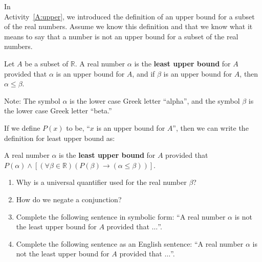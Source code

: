 \begin{activity} \label{A:least}
In \\ Activity~\ref{A:upper}, we introduced the definition of an upper bound for a subset of the real numbers.  Assume we know this definition and that we know what it means to say that a number is not an upper bound for a subset of the real numbers.

Let  $A$  be a subset of  $\mathbb{R}$.  A real number  $\alpha $ is the \textbf{least upper bound} for  $A$  provided that  $\alpha $  is an upper bound for  $A$, and if $\beta $ is an upper bound for  $A$, then  $\alpha  \leq \beta $.

Note:  The symbol  $\alpha $ is  the lower case Greek letter ``alpha'',  and the symbol  $\beta $ is  the lower case Greek letter ``beta.''

If we define  $P\left( x \right)$ to be, ``$x$  is an upper bound for  $A$'', then we can write the definition for least upper bound as:

A real number  $\alpha $ is the \textbf{least upper bound} for  $A$  provided that \\ $P\left( \alpha  \right) \wedge \left[ {\left( {\forall \beta  \in \mathbb{R}} \right)\left( {P\left( \beta  \right) \to \left( {\alpha  \leq \beta } \right)} \right)} \right]$.
%
\begin{enumerate}
  \item Why is a universal quantifier used for the real number  $\beta $?
  \item How do we negate a conjunction?
  \item Complete the following sentence in symbolic form:  ``A real number  $\alpha $ is not the least upper bound for  $A$  provided that $ \ldots $''.
  \item Complete the following sentence as an English sentence:  ``A real number  
$\alpha $ is not the least upper bound for  $A$  provided that $ \ldots $''.
\end{enumerate}

\end{activity}
